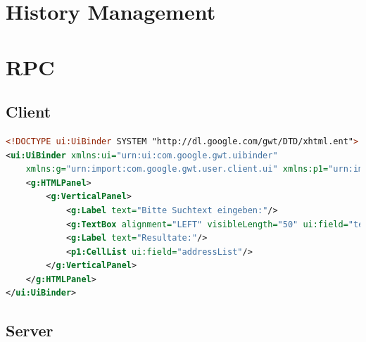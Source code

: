 \documentclass[a4paper,10pt]{scrreprt}
\begin{document}
\chapter{History Management}







\chapter{RPC}
\section{Client}




\begin{lstlisting}[caption=search panel xhtml,language=xml]
 <!DOCTYPE ui:UiBinder SYSTEM "http://dl.google.com/gwt/DTD/xhtml.ent">
<ui:UiBinder xmlns:ui="urn:ui:com.google.gwt.uibinder"
	xmlns:g="urn:import:com.google.gwt.user.client.ui" xmlns:p1="urn:import:com.google.gwt.user.cellview.client">
	<g:HTMLPanel>
		<g:VerticalPanel>
			<g:Label text="Bitte Suchtext eingeben:"/>
			<g:TextBox alignment="LEFT" visibleLength="50" ui:field="textBox"/>
			<g:Label text="Resultate:"/>
			<p1:CellList ui:field="addressList"/>
		</g:VerticalPanel>
	</g:HTMLPanel>
</ui:UiBinder> 
\end{lstlisting}

\section{Server}


\end{document}
